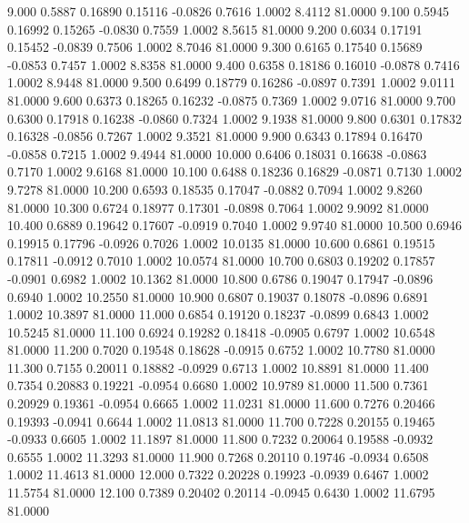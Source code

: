    9.000   0.5887   0.16890   0.15116  -0.0826   0.7616   1.0002   8.4112  81.0000
   9.100   0.5945   0.16992   0.15265  -0.0830   0.7559   1.0002   8.5615  81.0000
   9.200   0.6034   0.17191   0.15452  -0.0839   0.7506   1.0002   8.7046  81.0000
   9.300   0.6165   0.17540   0.15689  -0.0853   0.7457   1.0002   8.8358  81.0000
   9.400   0.6358   0.18186   0.16010  -0.0878   0.7416   1.0002   8.9448  81.0000
   9.500   0.6499   0.18779   0.16286  -0.0897   0.7391   1.0002   9.0111  81.0000
   9.600   0.6373   0.18265   0.16232  -0.0875   0.7369   1.0002   9.0716  81.0000
   9.700   0.6300   0.17918   0.16238  -0.0860   0.7324   1.0002   9.1938  81.0000
   9.800   0.6301   0.17832   0.16328  -0.0856   0.7267   1.0002   9.3521  81.0000
   9.900   0.6343   0.17894   0.16470  -0.0858   0.7215   1.0002   9.4944  81.0000
  10.000   0.6406   0.18031   0.16638  -0.0863   0.7170   1.0002   9.6168  81.0000
  10.100   0.6488   0.18236   0.16829  -0.0871   0.7130   1.0002   9.7278  81.0000
  10.200   0.6593   0.18535   0.17047  -0.0882   0.7094   1.0002   9.8260  81.0000
  10.300   0.6724   0.18977   0.17301  -0.0898   0.7064   1.0002   9.9092  81.0000
  10.400   0.6889   0.19642   0.17607  -0.0919   0.7040   1.0002   9.9740  81.0000
  10.500   0.6946   0.19915   0.17796  -0.0926   0.7026   1.0002  10.0135  81.0000
  10.600   0.6861   0.19515   0.17811  -0.0912   0.7010   1.0002  10.0574  81.0000
  10.700   0.6803   0.19202   0.17857  -0.0901   0.6982   1.0002  10.1362  81.0000
  10.800   0.6786   0.19047   0.17947  -0.0896   0.6940   1.0002  10.2550  81.0000
  10.900   0.6807   0.19037   0.18078  -0.0896   0.6891   1.0002  10.3897  81.0000
  11.000   0.6854   0.19120   0.18237  -0.0899   0.6843   1.0002  10.5245  81.0000
  11.100   0.6924   0.19282   0.18418  -0.0905   0.6797   1.0002  10.6548  81.0000
  11.200   0.7020   0.19548   0.18628  -0.0915   0.6752   1.0002  10.7780  81.0000
  11.300   0.7155   0.20011   0.18882  -0.0929   0.6713   1.0002  10.8891  81.0000
  11.400   0.7354   0.20883   0.19221  -0.0954   0.6680   1.0002  10.9789  81.0000
  11.500   0.7361   0.20929   0.19361  -0.0954   0.6665   1.0002  11.0231  81.0000
  11.600   0.7276   0.20466   0.19393  -0.0941   0.6644   1.0002  11.0813  81.0000
  11.700   0.7228   0.20155   0.19465  -0.0933   0.6605   1.0002  11.1897  81.0000
  11.800   0.7232   0.20064   0.19588  -0.0932   0.6555   1.0002  11.3293  81.0000
  11.900   0.7268   0.20110   0.19746  -0.0934   0.6508   1.0002  11.4613  81.0000
  12.000   0.7322   0.20228   0.19923  -0.0939   0.6467   1.0002  11.5754  81.0000
  12.100   0.7389   0.20402   0.20114  -0.0945   0.6430   1.0002  11.6795  81.0000
